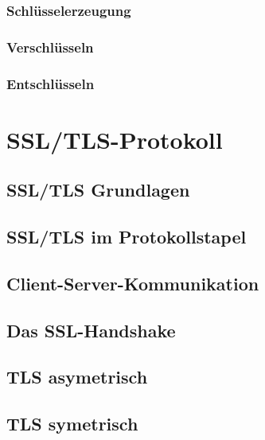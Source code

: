 \documentclass[11pt]{scrartcl}
\begin{document}
\subsubsection{Schlüsselerzeugung}
\label{sec:key-generation}

\subsubsection{Verschlüsseln}
\label{sec:rsa-encrypt}

\subsubsection{Entschlüsseln}
\label{sec:rsa-decrypt}

\section{SSL/TLS-Protokoll}
\label{sec:ssl/tls-protocol}

\subsection{SSL/TLS Grundlagen}
\label{sec:ssl-tls-basics}

\subsection{SSL/TLS im Protokollstapel}
\label{sec:ssl-tls-protocolstack}

\subsection{Client-Server-Kommunikation}
\label{sec:client-server-communication}



\subsection{Das SSL-Handshake}
\label{sec:ssl-handshake}

\subsection{TLS asymetrisch}
\label{sec:tls-asymetric}

\subsection{TLS symetrisch}
\label{sec:tls-symetric}
\end{document}
